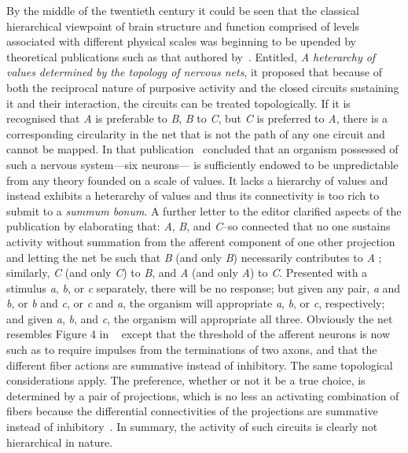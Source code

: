 \documentclass[11pt,3p,twocolumn]{JMN}
\begin{document}
By the middle of the twentieth century it could be seen that the classical hierarchical viewpoint of brain structure and function comprised of levels associated with different physical scales was beginning to be upended by theoretical publications such as that authored by~\citet{mcculloch45a}. Entitled, {\it{A heterarchy of values determined by the topology of nervous nets}}, it proposed that because of both the reciprocal nature of purposive activity and the closed circuits sustaining it and their interaction, the circuits can be treated topologically. If it is recognised that {\it{A}} is preferable to {\it{B}}, {\it{B}} to {\it{C}}, but {\it{C}} is preferred to {\it{A}}, there is a  corresponding circularity in the net that is not the path of any one circuit and cannot be mapped. In that publication~\citeauthor{mcculloch45a} concluded that an organism possessed of such a nervous system---six neurons--- is sufficiently endowed to be unpredictable from any theory founded on a scale of values. It lacks a hierarchy of values and instead exhibits a heterarchy of values and thus its connectivity is too rich to submit to a {\it{summum bonum}}. A further letter to the editor clarified aspects of the publication by elaborating that: {\it{A}}, {\it{B}}, and {\it{C}}--so connected that no one sustains activity without summation from the afferent component of one other projection and letting the net be such that {\it{B}} (and only {\it{B}}) necessarily contributes to {\it{A}} ; similarly, {\it{C}} (and only {\it{C}}) to {\it{B}}, and {\it{A}} (and only {\it{A}}) to {\it{C}}. Presented with a stimulus {\it{a}}, {\it{b}}, or {\it{c}} separately, there will be no response; but given any pair, {\it{a}} and {\it{b}}, or {\it{b}} and {\it{c}}, or {\it{c}} and {\it{a}}, the organism will appropriate {\it{a}}, {\it{b}}, or {\it{c}}, respectively; and given {\it{a}}, {\it{b}}, and {\it{c}}, the organism will appropriate all three. Obviously the net resembles Figure 4 in ~\citet{mcculloch45a} except that the threshold of the afferent neurons is now such as to require impulses from the terminations of two axons, and that the different fiber actions are summative instead of inhibitory. The same topological considerations apply. The preference, whether or not it be a true choice, is determined by a pair of projections, which is no less an activating combination of fibers because the differential connectivities of the projections are summative instead of inhibitory~\citep{mcculloch45b}. In summary, the activity of such circuits is clearly not hierarchical in nature.
\end{document}

